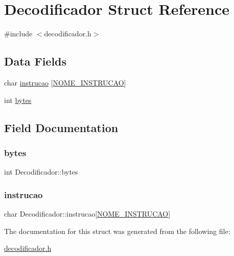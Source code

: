 \hypertarget{structDecodificador}{}\section{Decodificador Struct Reference}
\label{structDecodificador}


{\ttfamily \#include $<$decodificador.\+h$>$}

\subsection*{Data Fields}
\begin{DoxyCompactItemize}
\item 
char \hyperlink{structDecodificador_abd91e4ab4dc0ec38489f2c487132ccff}{instrucao} \mbox{[}\hyperlink{decodificador_8h_a33199dbdd3b5cb12a10b1cbd125293b8}{N\+O\+M\+E\+\_\+\+I\+N\+S\+T\+R\+U\+C\+AO}\mbox{]}
\item 
int \hyperlink{structDecodificador_a7081a89f9d4428ef33fb56f647363f72}{bytes}
\end{DoxyCompactItemize}


\subsection{Field Documentation}
\mbox{\label{structDecodificador_a7081a89f9d4428ef33fb56f647363f72}} 
\subsubsection{\texorpdfstring{bytes}{bytes}}
{\footnotesize\ttfamily int Decodificador\+::bytes}

\mbox{\label{structDecodificador_abd91e4ab4dc0ec38489f2c487132ccff}} 
\subsubsection{\texorpdfstring{instrucao}{instrucao}}
{\footnotesize\ttfamily char Decodificador\+::instrucao\mbox{[}\hyperlink{decodificador_8h_a33199dbdd3b5cb12a10b1cbd125293b8}{N\+O\+M\+E\+\_\+\+I\+N\+S\+T\+R\+U\+C\+AO}\mbox{]}}



The documentation for this struct was generated from the following file\+:\begin{DoxyCompactItemize}
\item 
\hyperlink{decodificador_8h}{decodificador.\+h}\end{DoxyCompactItemize}
